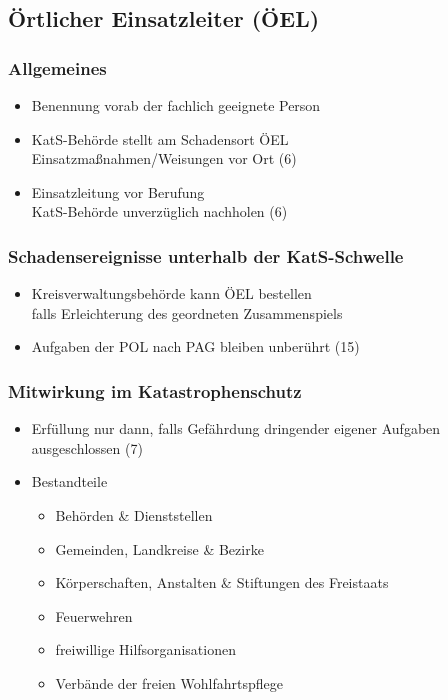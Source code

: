 \subsection{Örtlicher Einsatzleiter (ÖEL)}
\begin{normbox}{\subsubsection{Allgemeines}}
    \begin{itemize}
        \item Benennung vorab der fachlich geeignete Person
        \item KatS-Behörde stellt am Schadensort ÖEL\\
        \ra Einsatzmaßnahmen/Weisungen vor Ort (6)
        \item Einsatzleitung vor Berufung\\
        \ra KatS-Behörde unverzüglich nachholen (6)
    \end{itemize}
\end{normbox}
\begin{normbox}{\subsubsection{Schadensereignisse unterhalb der KatS-Schwelle}}
    \begin{itemize}
        \item Kreisverwaltungsbehörde kann ÖEL bestellen\\
        \ra falls Erleichterung des geordneten Zusammenspiels
        \item Aufgaben der POL nach PAG bleiben unberührt (15)
    \end{itemize}
\end{normbox}
\begin{normbox}{\subsubsection{Mitwirkung im Katastrophenschutz}}
    \begin{itemize}
        \item Erfüllung nur dann, falls Gefährdung dringender eigener Aufgaben ausgeschlossen (7)
        \item Bestandteile
        \begin{itemize}
            \item Behörden \& Dienststellen
            \item Gemeinden, Landkreise  \& Bezirke
            \item Körperschaften, Anstalten \& Stiftungen des Freistaats
            \item Feuerwehren
            \item freiwillige Hilfsorganisationen
            \item Verbände der freien Wohlfahrtspflege 
        \end{itemize}
    \end{itemize}
\end{normbox}
